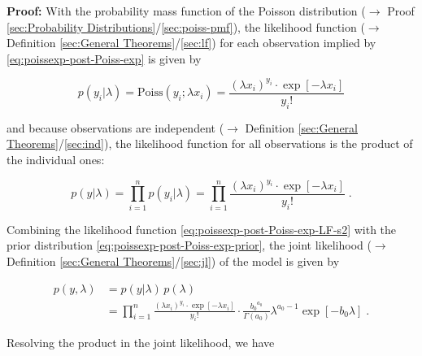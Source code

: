 \documentclass[a4paper,12pt,twoside]{book}
\begin{document}
\vspace{1em}
\textbf{Proof:} With the probability mass function of the Poisson distribution ($\rightarrow$ Proof \ref{sec:Probability Distributions}/\ref{sec:poiss-pmf}), the likelihood function ($\rightarrow$ Definition \ref{sec:General Theorems}/\ref{sec:lf}) for each observation implied by \eqref{eq:poissexp-post-Poiss-exp} is given by

\begin{equation} \label{eq:poissexp-post-Poiss-exp-LF-s1}
p(y_i|\lambda) = \mathrm{Poiss}(y_i; \lambda x_i) = \frac{(\lambda x_i)^{y_i} \cdot \exp\left[-\lambda x_i\right]}{y_i !}
\end{equation}

and because observations are independent ($\rightarrow$ Definition \ref{sec:General Theorems}/\ref{sec:ind}), the likelihood function for all observations is the product of the individual ones:

\begin{equation} \label{eq:poissexp-post-Poiss-exp-LF-s2}
p(y|\lambda) = \prod_{i=1}^n p(y_i|\lambda) = \prod_{i=1}^n \frac{(\lambda x_i)^{y_i} \cdot \exp\left[-\lambda x_i\right]}{y_i !} \; .
\end{equation}

Combining the likelihood function \eqref{eq:poissexp-post-Poiss-exp-LF-s2} with the prior distribution \eqref{eq:poissexp-post-Poiss-exp-prior}, the joint likelihood ($\rightarrow$ Definition \ref{sec:General Theorems}/\ref{sec:jl}) of the model is given by

\begin{equation} \label{eq:poissexp-post-Poiss-exp-JL-s1}
\begin{split}
p(y,\lambda) &= p(y|\lambda) \, p(\lambda) \\
&= \prod_{i=1}^n \frac{(\lambda x_i)^{y_i} \cdot \exp\left[-\lambda x_i\right]}{y_i !} \cdot \frac{ {b_0}^{a_0}}{\Gamma(a_0)} \lambda^{a_0-1} \exp[-b_0 \lambda] \; .
\end{split}
\end{equation}

Resolving the product in the joint likelihood, we have
\end{document}
